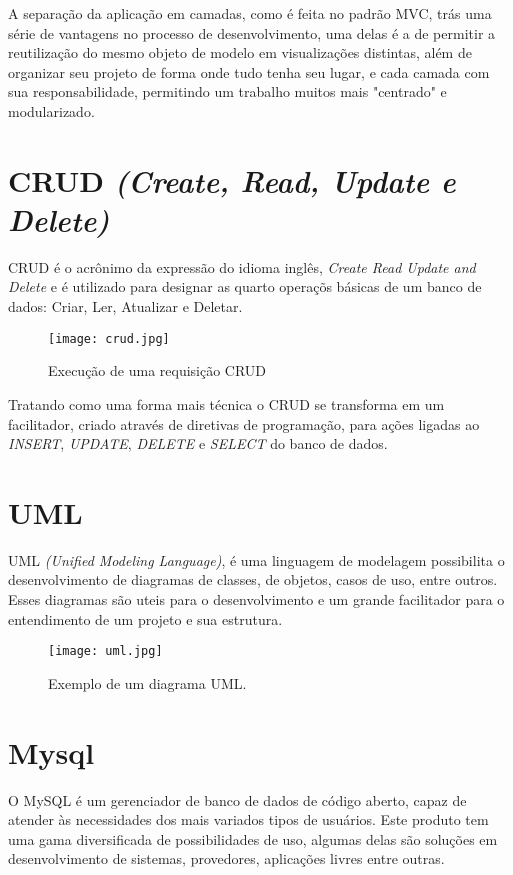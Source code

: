         A separação da aplicação em camadas, como é feita no padrão MVC, trás uma série de vantagens no processo de desenvolvimento, uma delas é a de permitir a reutilização do mesmo objeto de modelo em visualizações distintas, além de organizar seu projeto de forma onde tudo tenha seu lugar, e cada camada com sua responsabilidade, permitindo um trabalho muitos mais "centrado" e modularizado.


    \section{CRUD \emph{(Create, Read, Update e Delete)}\label{sec:crud}}
        CRUD é o acrônimo da expressão do idioma inglês, \emph{Create Read Update and Delete} e é utilizado para designar as quarto operaçõs básicas de um banco de dados: Criar, Ler, Atualizar e Deletar.
        \begin{figure}[!htb]
            \centering
            \texttt{[image: crud.jpg]}
            \caption{\small Execução de uma requisição CRUD}
            \label{cap:crud}
        \end{figure}

        Tratando como uma forma mais técnica o CRUD se transforma em um facilitador, criado através de diretivas de programação, para ações ligadas ao \emph{INSERT}, \emph{UPDATE}, \emph{DELETE} e \emph{SELECT} do banco de dados.



    \section{UML\label{sec:uml}}
        UML \emph{(Unified Modeling Language)}, é uma linguagem de modelagem possibilita o desenvolvimento de diagramas de classes, de objetos, casos de uso, entre outros. Esses diagramas são uteis para o desenvolvimento e um grande facilitador para o entendimento de um projeto e sua estrutura.

        \begin{figure}[!htb]
            \centering
            \texttt{[image: uml.jpg]}
            \caption{\small Exemplo de um diagrama UML.}
            \label{cap:uml}
        \end{figure}


    \section{Mysql\label{sec:mysql}}
        O MySQL é um gerenciador de banco de dados de código aberto, capaz de atender às necessidades dos mais variados tipos de usuários. Este produto tem uma gama diversificada de possibilidades de uso, algumas delas são soluções em desenvolvimento de sistemas, provedores, aplicações livres entre outras.

